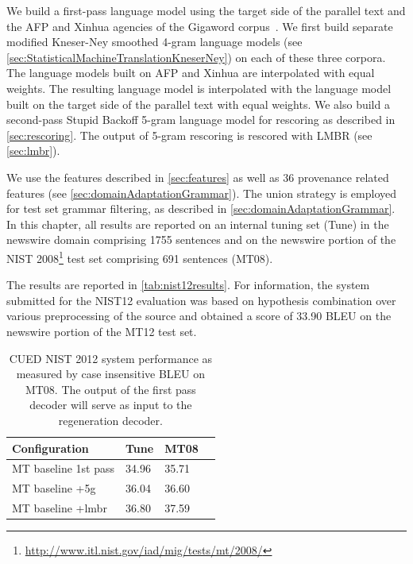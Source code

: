 We build a first-pass language model using the target side
of the parallel text and the AFP and Xinhua agencies of the
Gigaword corpus~\citep{parker-graff-kong-chen-maeda:2009:LDC}. %
We first build separate modified Kneser-Ney smoothed 4-gram language
models (see \autoref{sec:StatisticalMachineTranslationKneserNey})
on each of these three corpora. The language models built on AFP
and Xinhua are interpolated with equal weights. The
resulting language model is interpolated with the
language model built on the target side of the parallel
text with equal weights. We also build a second-pass %
Stupid Backoff 5-gram language model for rescoring
as described in \autoref{sec:rescoring}.
The output of 5-gram rescoring is rescored with LMBR (see \autoref{sec:lmbr}).

We use the features described in \autoref{sec:features}
as well as 36 provenance related features (see \autoref{sec:domainAdaptationGrammar}).
The union
strategy is employed for test set grammar filtering, as described
in \autoref{sec:domainAdaptationGrammar}.
In this chapter, all results are reported on an internal tuning set (Tune)
in the newswire domain comprising
1755 sentences and on the newswire portion of the NIST
2008\footnote{\url{http://www.itl.nist.gov/iad/mig/tests/mt/2008/}} test
set comprising 691 sentences (MT08).

The results are reported in \autoref{tab:nist12results}.
For information, the system submitted for the NIST12 evaluation was based
on hypothesis combination over various preprocessing of the source and obtained
a score of 33.90 BLEU on the newswire portion of the MT12 test set.
%
\begin{table}
  \begin{center}
    \begin{tabular}{l|lll}
      Configuration   & Tune & MT08 \\
      \hline
      MT baseline 1st pass & 34.96 & 35.71 \\
      MT baseline +5g      & 36.04 & 36.60 \\
      MT baseline +lmbr    & 36.80 & 37.59 \\
    \end{tabular}
    \caption{CUED NIST 2012 system performance as measured by case insensitive BLEU on MT08. The output of the
      first pass decoder will serve as input to the regeneration decoder.}
    \label{tab:nist12results}
  \end{center}
\end{table}

